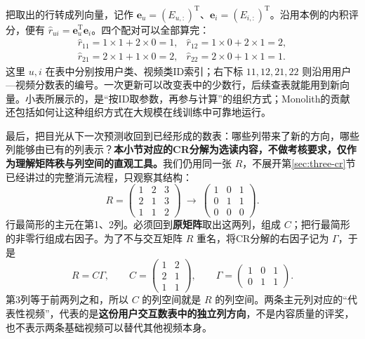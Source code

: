 \documentclass[a4paper,12pt,twoside,openany,fontset=none]{ctexbook}
\numberwithin{equation}{chapter}
\begin{document}
把取出的行转成列向量，记作 $\boldsymbol e_u=(E_{u,:})^{\mathrm T}$、$\boldsymbol e_i=(E_{i,:})^{\mathrm T}$。沿用本例的内积评分，便有 $\widehat r_{ui}=\boldsymbol e_u^{\mathrm T}\boldsymbol e_i$。四个配对可以全部算完：
\[
 \begin{array}{ll}
 \widehat r_{11}=1\times1+2\times0=1,&
 \widehat r_{12}=1\times0+2\times1=2,\\[3pt]
 \widehat r_{21}=2\times1+1\times0=2,&
 \widehat r_{22}=2\times0+1\times1=1.
 \end{array}
\]
这里 $u,i$ 在表中分别按用户类、视频类ID索引；右下标 $11,12,21,22$ 则沿用用户—视频分数表的编号。一次更新可以改变表中的少数行，后续查表就能用到新向量。小表所展示的，是“按ID取参数，再参与计算”的组织方式；Monolith的贡献还包括如何让这种组织方式在大规模在线训练中可靠地运行。

最后，把目光从下一次预测收回到已经形成的数表：哪些列带来了新的方向，哪些列能够由已有的列表示？\textbf{本小节对应的CR分解为选读内容，不做考核要求，仅作为理解矩阵秩与列空间的直观工具。}我们仍用同一张 $R$，不展开第\ref{sec:three-cr}节已经讲过的完整消元流程，只观察其结构：
\[
 R=\begin{pmatrix}1&2&3\\2&1&3\\1&1&2\end{pmatrix}
 \ \longrightarrow\ 
 \begin{pmatrix}1&0&1\\0&1&1\\0&0&0\end{pmatrix}.
\]
行最简形的主元在第1、2列。必须回到\textbf{原矩阵}取出这两列，组成 $C$；把行最简形的非零行组成右因子。为了不与交互矩阵 $R$ 重名，将CR分解的右因子记为 $\Gamma$，于是
\[
 R=C\Gamma,\qquad
 C=\begin{pmatrix}1&2\\2&1\\1&1\end{pmatrix},\qquad
 \Gamma=\begin{pmatrix}1&0&1\\0&1&1\end{pmatrix}.
\]
第3列等于前两列之和，所以 $C$ 的列空间就是 $R$ 的列空间。两条主元列对应的“代表性视频”，代表的是\textbf{这份用户交互数表中的独立列方向}，不是内容质量的评奖，也不表示两条基础视频可以替代其他视频本身。
\end{document}
